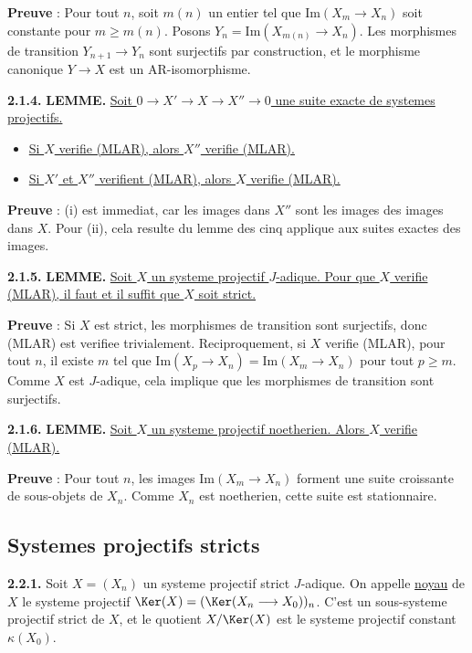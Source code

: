 \textbf{Preuve} : Pour tout $n$, soit $m(n)$ un entier tel que $\mathrm{Im}(X_m \longrightarrow X_n)$ soit constante pour $m \geq m(n)$. Posons $Y_n = \mathrm{Im}(X_{m(n)} \longrightarrow X_n)$. Les morphismes de transition $Y_{n+1} \longrightarrow Y_n$ sont surjectifs par construction, et le morphisme canonique $Y \longrightarrow X$ est un AR-isomorphisme.

\medskip
\noindent\textbf{2.1.4.} \textbf{LEMME.} \underline{Soit $0 \longrightarrow X' \longrightarrow X \longrightarrow X'' \longrightarrow 0$ une suite exacte de systemes projectifs.}
\begin{itemize}
\item[(i)] \underline{Si $X$ verifie (MLAR), alors $X''$ verifie (MLAR).}
\item[(ii)] \underline{Si $X'$ et $X''$ verifient (MLAR), alors $X$ verifie (MLAR).}
\end{itemize}

\textbf{Preuve} : (i) est immediat, car les images dans $X''$ sont les images des images dans $X$. Pour (ii), cela resulte du lemme des cinq applique aux suites exactes des images.

\medskip
\noindent\textbf{2.1.5.} \textbf{LEMME.} \underline{Soit $X$ un systeme projectif $J$-adique. Pour que $X$ verifie (MLAR), il faut et il suffit que $X$ soit strict.}

\textbf{Preuve} : Si $X$ est strict, les morphismes de transition sont surjectifs, donc (MLAR) est verifiee trivialement. Reciproquement, si $X$ verifie (MLAR), pour tout $n$, il existe $m$ tel que $\mathrm{Im}(X_p \longrightarrow X_n) = \mathrm{Im}(X_m \longrightarrow X_n)$ pour tout $p \geq m$. Comme $X$ est $J$-adique, cela implique que les morphismes de transition sont surjectifs.

\medskip
\noindent\textbf{2.1.6.} \textbf{LEMME.} \underline{Soit $X$ un systeme projectif noetherien. Alors $X$ verifie (MLAR).}

\textbf{Preuve} : Pour tout $n$, les images $\mathrm{Im}(X_m \longrightarrow X_n)$ forment une suite croissante de sous-objets de $X_n$. Comme $X_n$ est noetherien, cette suite est stationnaire.

\subsection{Systemes projectifs stricts}

\medskip
\noindent\textbf{2.2.1.} Soit $X = (X_n)$ un systeme projectif strict $J$-adique. On appelle \underline{noyau} de $X$ le systeme projectif $\Ker(X) = (\Ker(X_n \longrightarrow X_0))_n$. C'est un sous-systeme projectif strict de $X$, et le quotient $X / \Ker(X)$ est le systeme projectif constant $\kappa(X_0)$.

